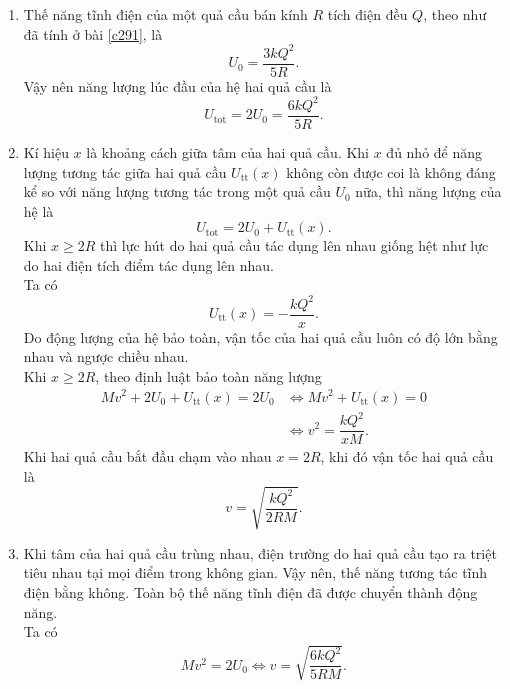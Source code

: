     \begin{loigiai}
    \begin{enumerate}[1)]
    \setlength{\itemsep}{0pt}
        \item Thế năng tĩnh điện của một quả cầu bán kính $R$ tích điện đều $Q$, theo như đã tính ở bài \ref{c291}, là
        $$U_0=\dfrac{3kQ^2}{5R}.$$
        Vậy nên năng lượng lúc đầu của hệ hai quả cầu là
        $$U_{\mathrm{tot}}=2U_0=\dfrac{6kQ^2}{5R}.$$
        \item Kí hiệu $x$ là khoảng cách giữa tâm của hai quả cầu. Khi $x$ đủ nhỏ để năng lượng tương tác giữa hai quả cầu $U_{\mathrm{tt}}(x)$ không còn được coi là không đáng kể so với năng lượng tương tác trong một quả cầu $U_0$ nữa, thì năng lượng của hệ là
        $$U_{\mathrm{tot}}=2U_0+U_{\mathrm{tt}}(x).$$
        Khi $x\geq 2R$ thì lực hút do hai quả cầu tác dụng lên nhau giống hệt như lực do hai điện tích điểm tác dụng lên nhau.\\
        Ta có
        $$U_{\mathrm{tt}}(x)=-\dfrac{kQ^2}{x}.$$
        Do động lượng của hệ bảo toàn, vận tốc của hai quả cầu luôn có độ lớn bằng nhau và ngược chiều nhau. \\
        Khi $x\geq 2R$, theo định luật bảo toàn năng lượng
        \begin{equation*}
        \begin{aligned}
           Mv^2+2U_0+U_{\mathrm{tt}}(x)=2U_0
           &\Leftrightarrow Mv^2+U_{\mathrm{tt}}(x)=0\\
           &\Leftrightarrow  v^2=\dfrac{kQ^2}{xM}.
        \end{aligned}
        \end{equation*}
        Khi hai quả cầu bắt đầu chạm vào nhau $x=2R$, khi đó vận tốc hai quả cầu là
        $$v=\sqrt{\dfrac{kQ^2}{2RM}}.$$
        \item Khi tâm của hai quả cầu trùng nhau, điện trường do hai quả cầu tạo ra triệt tiêu nhau tại mọi điểm trong không gian. Vậy nên, thế năng tương tác tĩnh điện bằng không. Toàn bộ thế năng tĩnh điện đã được chuyển thành động năng.\\
        Ta có
        \begin{equation*}
            \begin{aligned}
               Mv^2=2U_0\Leftrightarrow v=\sqrt{\dfrac{6kQ^2}{5RM}}.
            \end{aligned}
        \end{equation*}
    \end{enumerate}
    \end{loigiai}
    
